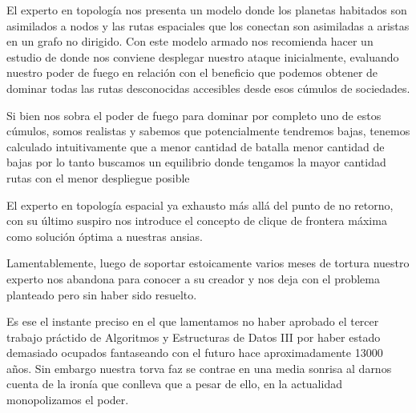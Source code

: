 El experto en topolog\'ia nos presenta un modelo donde los planetas 
habitados son asimilados a nodos y las rutas espaciales que los conectan
son asimiladas a aristas en un grafo no dirigido. Con este modelo
armado nos recomienda hacer un estudio de donde nos conviene 
desplegar nuestro ataque inicialmente, evaluando nuestro poder de
fuego en relaci\'on con el beneficio que podemos obtener de 
dominar todas las rutas desconocidas accesibles desde esos c\'umulos
de sociedades.

Si bien nos sobra el poder de fuego para dominar por completo 
uno de estos c\'umulos, somos realistas y sabemos que potencialmente
tendremos bajas, tenemos calculado intuitivamente que a menor
cantidad de batalla menor cantidad de bajas por lo tanto buscamos
un equilibrio donde tengamos la mayor cantidad rutas con el menor
despliegue posible

El experto en topolog\'ia espacial ya exhausto m\'as all\'a del punto
de no retorno, con su \'ultimo suspiro nos introduce el concepto de 
clique de frontera m\'axima como soluci\'on \'optima a nuestras ansias.

Lamentablemente, luego de soportar estoicamente varios meses de tortura
nuestro experto nos abandona para conocer a su creador y nos deja con el 
problema planteado pero sin haber sido resuelto.

Es ese el instante preciso en el que lamentamos no haber aprobado el 
tercer trabajo pr\'actido de Algoritmos y Estructuras de Datos III 
por haber estado demasiado ocupados fantaseando con el futuro hace
aproximadamente 13000 a\~nos. Sin embargo nuestra torva faz se contrae
en una media sonrisa al darnos cuenta de la iron\'ia que conlleva que 
a pesar de ello, en la actualidad monopolizamos el poder.
